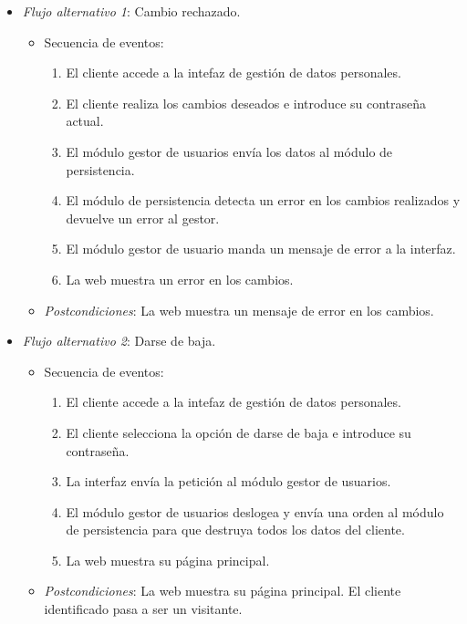 \begin{enumerate}[{\bf UC-1}]
\begin{itemize}
  \item {\it Flujo alternativo 1}: Cambio rechazado.
\begin{itemize}
\item Secuencia de eventos:

    \begin{enumerate}[1. ]
	\item El cliente accede a la intefaz de gestión de datos personales.
    \item	El cliente realiza los cambios deseados e introduce su contraseña actual.
    \item El módulo gestor de usuarios envía los datos al módulo de persistencia.
    \item El módulo de persistencia detecta un error en los cambios realizados y devuelve un error al gestor.
    \item El módulo gestor de usuario manda un mensaje de error a la interfaz.
    \item La web muestra un error en los cambios.
    \end{enumerate}
  \item {\it Postcondiciones}:  La web muestra un mensaje de error en los cambios.
\end{itemize}
    

   \item {\it Flujo alternativo 2}: Darse de baja.
\begin{itemize}
\item Secuencia de eventos:

   
    \begin{enumerate}[1. ]
	\item El cliente accede a la intefaz de gestión de datos personales.
    \item	El cliente selecciona la opción de darse de baja e introduce su contraseña.
    \item La interfaz envía la petición al módulo gestor de usuarios.
    \item El módulo gestor de usuarios deslogea y envía una orden al módulo de persistencia para que destruya todos los datos del cliente.
    \item La web muestra su página principal.
    \end{enumerate}
 \item {\it Postcondiciones}: La web muestra su página principal. El cliente identificado pasa a ser un visitante.
\end{itemize}


\end{itemize}
\end{enumerate}
